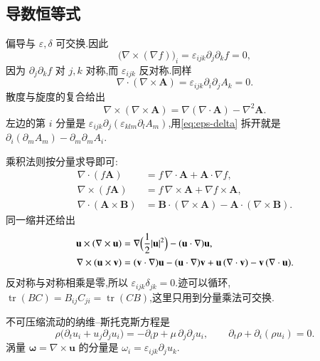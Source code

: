 \subsection{导数恒等式}
偏导与 $\varepsilon,\delta$ 可交换.因此
\begin{equation}
  \bigl(\nabla\times(\nabla f)\bigr)_i
  =\varepsilon_{ijk}\partial_j\partial_k f=0,
\end{equation}
因为 $\partial_j\partial_k f$ 对 $j,k$ 对称,而 $\varepsilon_{ijk}$ 反对称.同样
\begin{equation}
  \nabla\cdot(\nabla\times\mathbf{A})
  =\varepsilon_{ijk}\partial_i\partial_j A_k=0.
\end{equation}
散度与旋度的复合给出
\begin{equation}
  \nabla\times(\nabla\times\mathbf{A})
  =\nabla(\nabla\cdot\mathbf{A})-\nabla^2\mathbf{A}.
  \label{eq:curl-curl}
\end{equation}
左边的第 $i$ 分量是 $\varepsilon_{ijk}\partial_j(\varepsilon_{klm}\partial_l A_m)$,用\eqref{eq:eps-delta} 拆开就是 $\partial_i(\partial_m A_m)-\partial_m\partial_m A_i$.

乘积法则按分量求导即可:
\begin{align}
  \nabla\cdot(f\mathbf{A})
  &=f\,\nabla\cdot\mathbf{A}+\mathbf{A}\cdot\nabla f, \\
  \nabla\times(f\mathbf{A})
  &=f\,\nabla\times\mathbf{A}+\nabla f\times\mathbf{A}, \\
  \nabla\cdot(\mathbf{A}\times\mathbf{B})
  &=\mathbf{B}\cdot(\nabla\times\mathbf{A})
    -\mathbf{A}\cdot(\nabla\times\mathbf{B}).
\end{align}
同一缩并还给出
\begin{equation}
\begin{aligned}
  \mathbf{u}\times(\nabla\times\mathbf{u})
  &=\nabla\Bigl(\frac12|\mathbf{u}|^2\Bigr)
   -(\mathbf{u}\cdot\nabla)\mathbf{u}, \\
  \nabla\times(\mathbf{u}\times\mathbf{v})
  &=(\mathbf{v}\cdot\nabla)\mathbf{u}
   -(\mathbf{u}\cdot\nabla)\mathbf{v}
   +\mathbf{u}\,(\nabla\cdot\mathbf{v})
   -\mathbf{v}\,(\nabla\cdot\mathbf{u}).
\end{aligned}
\end{equation}
反对称与对称相乘是零,所以 $\varepsilon_{ijk}\delta_{jk}=0$.迹可以循环,$\operatorname{tr}(BC)=B_{ij}C_{ji}=\operatorname{tr}(CB)$,这里只用到分量乘法可交换.

不可压缩流动的纳维--斯托克斯方程是
\begin{equation}
  \rho\bigl(\partial_t u_i+u_j\partial_j u_i\bigr)
  =-\partial_i p+\mu\,\partial_j\partial_j u_i,
  \qquad
  \partial_t\rho+\partial_i(\rho u_i)=0.
\end{equation}
涡量 $\boldsymbol{\omega}=\nabla\times\mathbf{u}$ 的分量是 $\omega_i=\varepsilon_{ijk}\partial_j u_k$.


